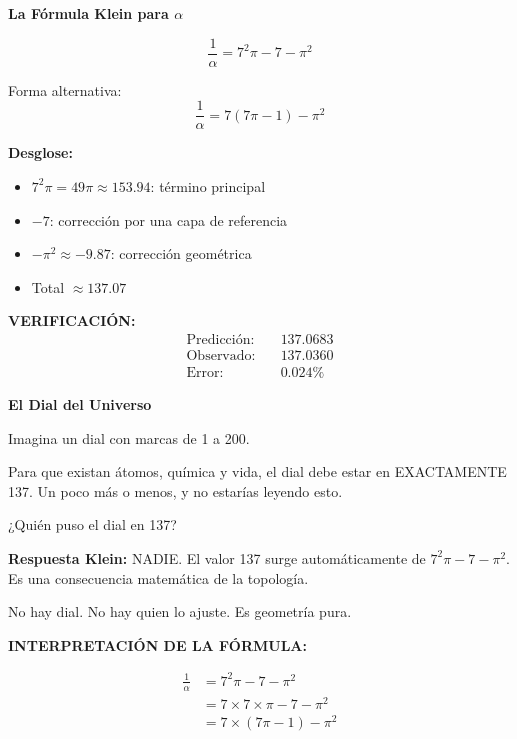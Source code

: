 \begin{nivelmatematico}
\textbf{La Fórmula Klein para $\alpha$}

\begin{equation}
\boxed{\frac{1}{\alpha} = 7^2\pi - 7 - \pi^2}
\end{equation}

Forma alternativa:
\begin{equation}
\frac{1}{\alpha} = 7(7\pi - 1) - \pi^2
\end{equation}

\textbf{Desglose:}
\begin{itemize}
    \item $7^2\pi = 49\pi \approx 153.94$: término principal
    \item $-7$: corrección por una capa de referencia
    \item $-\pi^2 \approx -9.87$: corrección geométrica
    \item Total $\approx 137.07$
\end{itemize}

\textbf{VERIFICACIÓN:}
\begin{align}
\text{Predicción:} & \quad 137.0683\\
\text{Observado:} & \quad 137.0360\\
\text{Error:} & \quad 0.024\%
\end{align}
\end{nivelmatematico}

\begin{analogiabox}
\textbf{El Dial del Universo}

Imagina un dial con marcas de 1 a 200.

Para que existan átomos, química y vida, el dial debe estar
en EXACTAMENTE 137. Un poco más o menos, y no estarías leyendo esto.

¿Quién puso el dial en 137?

\textbf{Respuesta Klein:} NADIE. El valor 137 surge automáticamente de
$7^2\pi - 7 - \pi^2$. Es una consecuencia matemática de la topología.

No hay dial. No hay quien lo ajuste. Es geometría pura.
\end{analogiabox}

\textbf{INTERPRETACIÓN DE LA FÓRMULA:}

\begin{align}
\frac{1}{\alpha} &= 7^2\pi - 7 - \pi^2\\
&= 7 \times 7 \times \pi - 7 - \pi^2\\
&= 7 \times (7\pi - 1) - \pi^2
\end{align}

